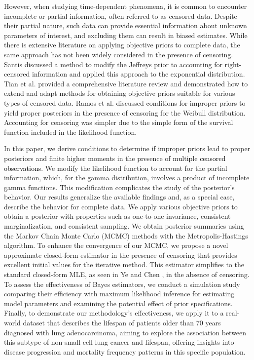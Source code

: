 \documentclass[]{interact}
\theoremstyle{plain}%
\theoremstyle{definition}
\theoremstyle{remark}
\begin{document}
However, when studying time-dependent phenomena, it is common to encounter incomplete or partial information, often referred to as censored data. Despite their partial nature, such data can provide essential information about unknown parameters of interest, and excluding them can result in biased estimates. While there is extensive literature on applying objective priors to complete data, the same approach has not been widely considered in the presence of censoring. Santis \cite{de2001jeffreys} discussed a method to modify the Jeffreys prior to accounting for {\color{black}right-censored information} and applied this approach to the exponential distribution. Tian et al. \cite{tian2022specifying} provided a comprehensive literature review and demonstrated how to extend and adapt methods for obtaining objective priors suitable for various types of censored data. Ramos et al. \cite{ramos2020posterior} discussed conditions for improper priors to yield proper posteriors in the presence of censoring for the Weibull distribution. Accounting for censoring was simpler due to the simple form of the survival function included in the likelihood function.


In this paper, we derive conditions to determine if improper priors lead to proper posteriors and finite higher moments in the presence of \textcolor{black}{multiple censored observations}. We modify the likelihood function to account for the partial information, which, for the gamma distribution, involves a product of incomplete gamma functions. This modification complicates the study of the posterior's behavior. Our results generalize the available findings and, as a special case, describe the behavior for complete data. We apply various objective priors to obtain a posterior with properties such as one-to-one invariance, consistent marginalization, and consistent sampling. We obtain posterior summaries using the Markov Chain Monte Carlo (MCMC) methods with the Metropolis-Hastings algorithm. To enhance the convergence of our MCMC, we propose a novel approximate closed-form estimator in the presence of censoring that provides excellent initial values for the iterative method. This estimator simplifies to the standard closed-form MLE, as seen in Ye and Chen \cite{ye2017closed}, in the absence of censoring. To assess the effectiveness of Bayes estimators, we conduct a simulation study comparing their efficiency with maximum likelihood inference for estimating model parameters and examining the potential effect of prior specifications. Finally, to demonstrate our methodology's effectiveness, we apply it to a real-world dataset that describes the lifespan of patients older than 70 years diagnosed with lung adenocarcinoma, aiming to explore the association between this subtype of non-small cell lung cancer and lifespan, offering insights into disease progression and mortality frequency patterns in this specific population.
\end{document}
